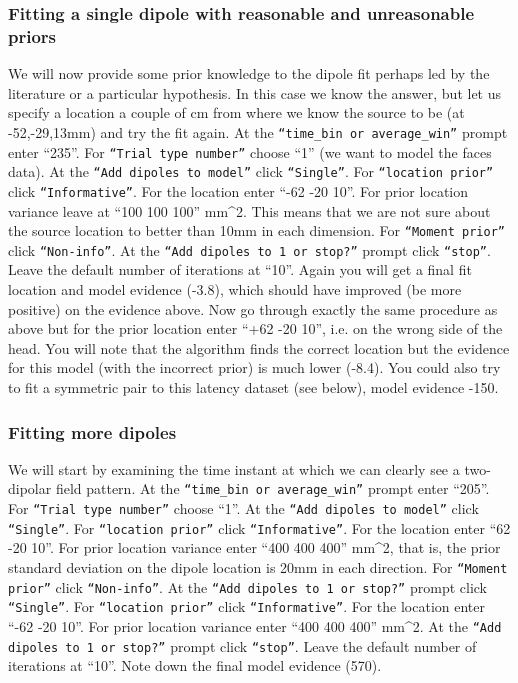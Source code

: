 \subsubsection{Fitting a single dipole with reasonable and unreasonable priors}
We will now provide some prior knowledge to the dipole fit perhaps led by the literature or a particular hypothesis. In this case we know the answer, but let us specify a location a couple of cm from where we know the source to be (at -52,-29,13mm) and try the fit again.
At the  \texttt{``time\_bin or average\_win''} prompt enter ``235''. For  \texttt{``Trial type number''} choose ``1'' (we want to model the faces data). At the  \texttt{``Add dipoles to model''} click  \texttt{``Single''}. For  \texttt{``location prior''} click  \texttt{``Informative''}. For the location enter ``-62 -20 10''. For prior location variance leave at ``100 100 100'' mm^2. This means that we are not sure about the source location to better than 10mm in each dimension. For  \texttt{``Moment prior''} click  \texttt{``Non-info''}. At the  \texttt{``Add dipoles to 1 or stop?''} prompt click  \texttt{``stop''}. Leave the default number of iterations at ``10''. Again you will get a final fit location and model evidence (-3.8), which should have improved (be more positive) on the evidence above. 
Now go through exactly the same procedure as above but for the prior location enter ``+62 -20 10'', i.e. on the wrong side of the head. You will note that the algorithm finds the correct location but the evidence for this model (with the incorrect prior) is much lower (-8.4). You could also try to fit a symmetric pair to this latency dataset (see below), model evidence -150.

\subsubsection{Fitting more dipoles}
We will start by examining the time instant at which we can clearly see a two-dipolar field pattern.
At the \texttt{``time\_bin or average\_win''} prompt enter ``205''. For \texttt{``Trial type number''} choose ``1''. At the \texttt{``Add dipoles to model''} click \texttt{``Single''}. For \texttt{``location prior''} click \texttt{``Informative''}. For the location enter ``62 -20 10''. For prior location variance enter ``400 400 400'' mm^2, that is, the prior standard deviation on the dipole location is 20mm in each direction. For \texttt{``Moment prior''} click \texttt{``Non-info''}. At the \texttt{``Add dipoles to 1 or stop?''} prompt click \texttt{``Single''}. For \texttt{``location prior''} click \texttt{``Informative''}. For the location enter ``-62 -20 10''. For prior location variance enter ``400 400 400'' mm^2. At the \texttt{``Add dipoles to 1 or stop?''} prompt click \texttt{``stop''}. Leave the default number of iterations at ``10''. Note down the final model evidence (570). 

